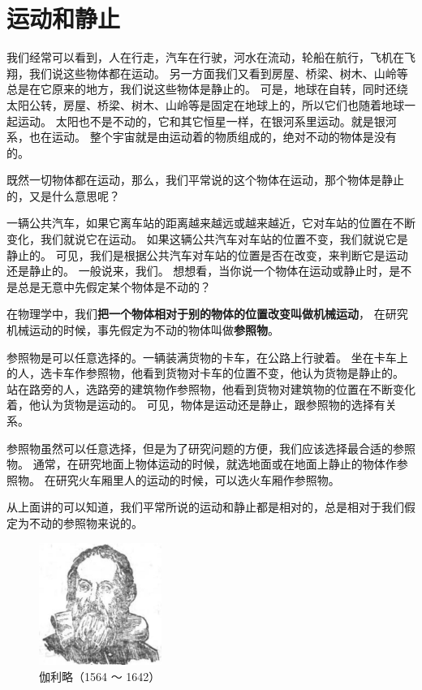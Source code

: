 \section{运动和静止}\label{sec:3-1}

我们经常可以看到，人在行走，汽车在行驶，河水在流动，轮船在航行，飞机在飞翔，我们说这些物体都在运动。
另一方面我们又看到房屋、桥梁、树木、山岭等总是在它原来的地方，我们说这些物体是静止的。
可是，地球在自转，同时还绕太阳公转，房屋、桥梁、树木、山岭等是固定在地球上的，所以它们也随着地球一起运动。
太阳也不是不动的，它和其它恒星一样，在银河系里运动。就是银河系，也在运动。
整个宇宙就是由运动着的物质组成的，绝对不动的物体是没有的。

既然一切物体都在运动，那么，我们平常说的这个物体在运动，那个物体是静止的，又是什么意思呢？

一辆公共汽车，如果它离车站的距离越来越远或越来越近，它对车站的位置在不断变化，我们就说它在运动。
如果这辆公共汽车对车站的位置不变，我们就说它是静止的。
可见，我们是根据公共汽车对车站的位置是否在改变，来判断它是运动还是静止的。
一般说来，我们。
想想看，当你说一个物体在运动或静止时，是不是总是无意中先假定某个物体是不动的？

在物理学中，我们\textbf{把一个物体相对于别的物体的位置改变叫做机械运动}，
在研究机械运动的时候，事先假定为不动的物体叫做\textbf{参照物}。

参照物是可以任意选择的。一辆装满货物的卡车，在公路上行驶着。
坐在卡车上的人，选卡车作参照物，他看到货物对卡车的位置不变，他认为货物是静止的。
站在路旁的人，选路旁的建筑物作参照物，他看到货物对建筑物的位置在不断变化着，他认为货物是运动的。
可见，物体是运动还是静止，跟参照物的选择有关系。

参照物虽然可以任意选择，但是为了研究问题的方便，我们应该选择最合适的参照物。
通常，在研究地面上物体运动的时候，就选地面或在地面上静止的物体作参照物。
在研究火车厢里人的运动的时候，可以选火车厢作参照物。

从上面讲的可以知道，我们平常所说的运动和静止都是相对的，总是相对于我们假定为不动的参照物来说的。

\newpage



\begin{figure}
    \centering
    \includegraphics[width=4cm]{../pic/czwl1-ch3-a}
    \caption*{伽利略（1564 ～ 1642）}
\end{figure}

